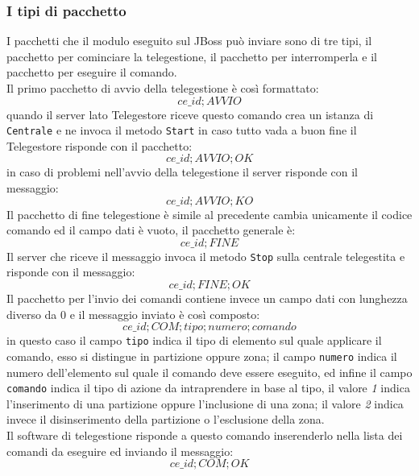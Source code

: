 \subsubsection{I tipi di pacchetto}
I pacchetti che il modulo eseguito sul JBoss può inviare sono di tre tipi, il pacchetto per cominciare la telegestione, il pacchetto per interromperla e il pacchetto per eseguire il comando.\\
Il primo pacchetto di avvio della telegestione è così formattato:
$$ce\_id;AVVIO$$
quando il server lato Telegestore riceve questo comando crea un istanza di \texttt{Centrale} e ne invoca il metodo \texttt{Start} in caso tutto vada a buon fine il Telegestore risponde con il pacchetto:
$$ce\_id;AVVIO;OK$$
in caso di problemi nell'avvio della telegestione il server risponde con il messaggio:
$$ce\_id;AVVIO;KO$$
Il pacchetto di fine telegestione è simile al precedente cambia unicamente il codice comando ed il campo dati è vuoto, il pacchetto generale è:
$$ce\_id;FINE$$
Il server che riceve il messaggio invoca il metodo \texttt{Stop} sulla centrale telegestita e risponde con il messaggio:
$$ce\_id;FINE;OK$$
Il pacchetto per l'invio dei comandi contiene invece un campo dati con lunghezza diverso da 0 e il messaggio inviato è così composto:
$$ce\_id;COM;tipo;numero;comando$$
in questo caso il campo \texttt{tipo} indica il tipo di elemento sul quale applicare il comando, esso si distingue in partizione oppure zona; il campo \texttt{numero} indica il numero dell'elemento sul quale il comando deve essere eseguito, ed infine il campo \texttt{comando} indica il tipo di azione da intraprendere in base al tipo, il valore \emph{1} indica l'inserimento di una partizione oppure l'inclusione di una zona; il valore \emph{2} indica invece il disinserimento della partizione o l'esclusione della zona.\\
Il software di telegestione risponde a questo comando inserenderlo nella lista dei comandi da eseguire ed inviando il messaggio:
$$ce\_id;COM;OK$$
